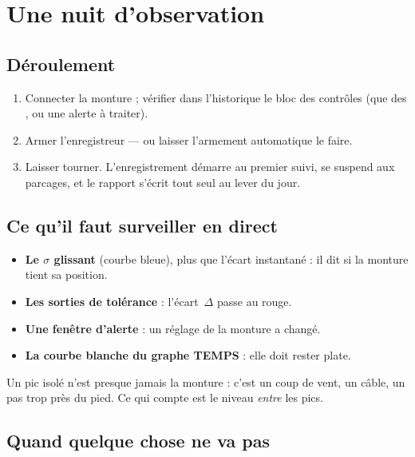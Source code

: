 \chapter{Une nuit d'observation}
\label{ch:night}

\section{Déroulement}

\begin{enumerate}
  \item Connecter la monture ; vérifier dans l'historique le bloc des contrôles
  (que des \checkmark, ou une alerte à traiter).
  \item Armer l'enregistreur --- ou laisser l'armement automatique le faire.
  \item Laisser tourner. L'enregistrement démarre au premier suivi, se suspend
  aux parcages, et le rapport s'écrit tout seul au lever du jour.
\end{enumerate}

\section{Ce qu'il faut surveiller en direct}

\begin{itemize}
  \item \textbf{Le $\sigma$ glissant} (courbe bleue), plus que l'écart instantané : il
  dit si la monture tient sa position.
  \item \textbf{Les sorties de tolérance} : l'écart~$\Delta$ passe au rouge.
  \item \textbf{Une fenêtre d'alerte} : un réglage de la monture a changé.
  \item \textbf{La courbe blanche du graphe TEMPS} : elle doit rester plate.
\end{itemize}

\begin{tip}
Un pic isolé n'est presque jamais la monture : c'est un coup de vent, un câble,
un pas trop près du pied. Ce qui compte est le niveau \emph{entre} les pics.
\end{tip}

\section{Quand quelque chose ne va pas}

